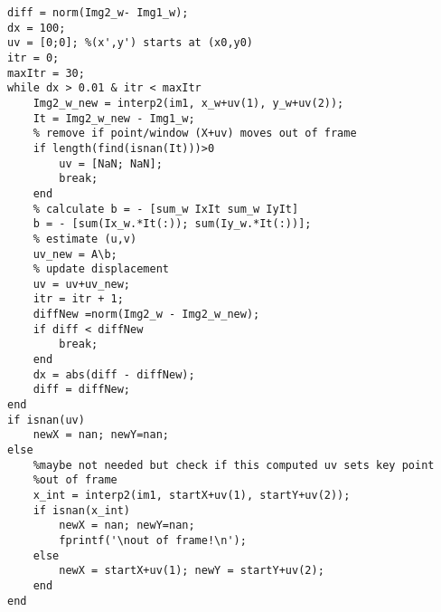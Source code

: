 \begin{verbatim}
diff = norm(Img2_w- Img1_w);
dx = 100;
uv = [0;0]; %(x',y') starts at (x0,y0) 
itr = 0;
maxItr = 30;
while dx > 0.01 & itr < maxItr
    Img2_w_new = interp2(im1, x_w+uv(1), y_w+uv(2));
    It = Img2_w_new - Img1_w;    
    % remove if point/window (X+uv) moves out of frame
    if length(find(isnan(It)))>0
        uv = [NaN; NaN];
        break;
    end
    % calculate b = - [sum_w IxIt sum_w IyIt]
    b = - [sum(Ix_w.*It(:)); sum(Iy_w.*It(:))];
    % estimate (u,v)
    uv_new = A\b;
    % update displacement
    uv = uv+uv_new;
    itr = itr + 1;
    diffNew =norm(Img2_w - Img2_w_new);
    if diff < diffNew
        break;
    end
    dx = abs(diff - diffNew);
    diff = diffNew;
end
if isnan(uv)
    newX = nan; newY=nan;
else 
    %maybe not needed but check if this computed uv sets key point
    %out of frame
    x_int = interp2(im1, startX+uv(1), startY+uv(2));
    if isnan(x_int)
        newX = nan; newY=nan;
        fprintf('\nout of frame!\n');
    else
        newX = startX+uv(1); newY = startY+uv(2);
    end
end
\end{verbatim}






